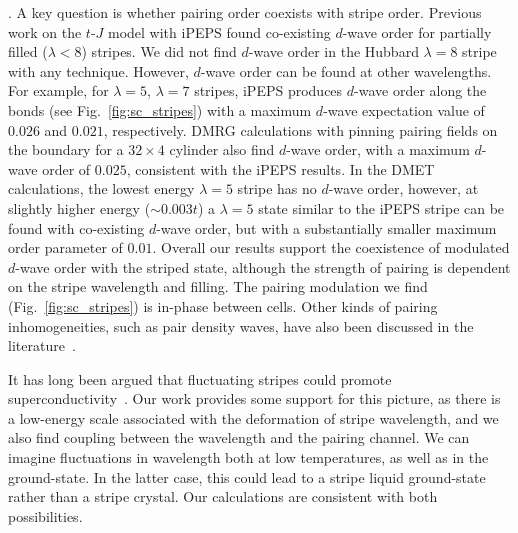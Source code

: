 \documentclass[12pt]{article}
\begin{document}
. A key question is whether pairing order coexists with stripe order. 
Previous work on the $t$-$J$ model with iPEPS found co-existing $d$-wave order for partially filled ($\lambda < 8$) stripes.
We did not find $d$-wave order in the Hubbard $\lambda=8$ stripe with any technique. 
However, $d$-wave order can be found at other wavelengths. For example, for $\lambda=5$, $\lambda=7$ stripes,
iPEPS produces $d$-wave order along the bonds (see Fig.~\ref{fig:sc_stripes}) with a maximum $d$-wave expectation value of $0.026$ and $0.021$, respectively. DMRG calculations with pinning pairing fields on the boundary for  a $32 \times 4$ cylinder also find $d$-wave order, with a maximum $d$-wave order of $0.025$, consistent with the iPEPS results. In the DMET calculations, the lowest energy $\lambda=5$ stripe
has no $d$-wave order, however, at slightly higher energy ($\sim 0.003t$) a $\lambda=5$ state similar to the iPEPS stripe can be
found with co-existing $d$-wave order, but with a substantially smaller maximum order parameter of $0.01$. Overall
our results support the coexistence of modulated $d$-wave order with the striped state, although the strength
of pairing is dependent on the stripe wavelength and filling. The pairing modulation we find  (Fig.~\ref{fig:sc_stripes})
is in-phase between cells. Other kinds of pairing inhomogeneities, such as pair density waves,
have also been discussed in the literature~\cite{Fradkin2015}. 


It has long been argued that fluctuating stripes could promote superconductivity~\cite{emery1997spin,kivelson1998electronic,zaanen2001}.
Our work provides some support for this picture, as there is a low-energy scale associated with
the deformation of stripe wavelength, and we also find coupling between the wavelength and the pairing channel.
We can imagine fluctuations in wavelength both at low temperatures, as well as in the ground-state. In the latter case,
this could lead to a stripe liquid ground-state rather than a stripe crystal. Our calculations are consistent with both possibilities.
\end{document}

